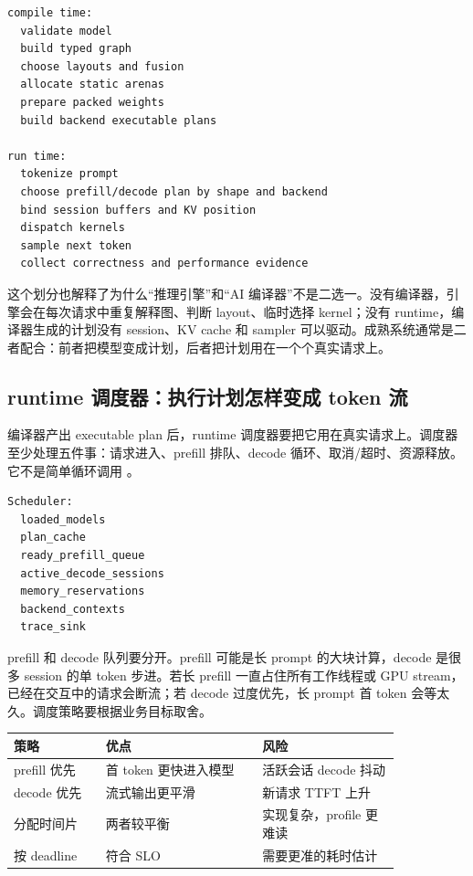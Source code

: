 \begin{lstlisting}[numbers=none,caption={编译期和运行期的责任划分}]
compile time:
  validate model
  build typed graph
  choose layouts and fusion
  allocate static arenas
  prepare packed weights
  build backend executable plans

run time:
  tokenize prompt
  choose prefill/decode plan by shape and backend
  bind session buffers and KV position
  dispatch kernels
  sample next token
  collect correctness and performance evidence
\end{lstlisting}

这个划分也解释了为什么“推理引擎”和“AI 编译器”不是二选一。没有编译器，引擎会在每次请求中重复解释图、判断 layout、临时选择 kernel；没有 runtime，编译器生成的计划没有 session、KV cache 和 sampler 可以驱动。成熟系统通常是二者配合：前者把模型变成计划，后者把计划用在一个个真实请求上。

\subsection{runtime 调度器：执行计划怎样变成 token 流}

编译器产出 executable plan 后，runtime 调度器要把它用在真实请求上。调度器至少处理五件事：请求进入、prefill 排队、decode 循环、取消/超时、资源释放。它不是简单循环调用 。

\begin{lstlisting}[numbers=none,caption={runtime 调度器的最小状态}]
Scheduler:
  loaded_models
  plan_cache
  ready_prefill_queue
  active_decode_sessions
  memory_reservations
  backend_contexts
  trace_sink
\end{lstlisting}

prefill 和 decode 队列要分开。prefill 可能是长 prompt 的大块计算，decode 是很多 session 的单 token 步进。若长 prefill 一直占住所有工作线程或 GPU stream，已经在交互中的请求会断流；若 decode 过度优先，长 prompt 首 token 会等太久。调度策略要根据业务目标取舍。

\begin{center}
\begin{tabular}{p{0.20\linewidth}p{0.34\linewidth}p{0.30\linewidth}}
\toprule
策略 & 优点 & 风险 \\
\midrule
prefill 优先 & 首 token 更快进入模型 & 活跃会话 decode 抖动 \\
decode 优先 & 流式输出更平滑 & 新请求 TTFT 上升 \\
分配时间片 & 两者较平衡 & 实现复杂，profile 更难读 \\
按 deadline & 符合 SLO & 需要更准的耗时估计 \\
\bottomrule
\end{tabular}
\end{center}

